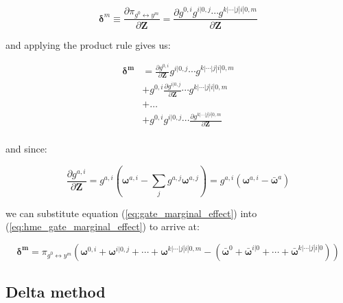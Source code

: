 \documentclass[12pt]{article}
\newcommand{\mean}[1]{\bar{#1}}
\newcommand{\gateprod}[2]{\pi_{#1 \longleftrightarrow #2}}
\begin{document}
\begin{equation}
  \boldsymbol{\delta}^{m} \equiv \frac{\partial \gateprod{g^{0}}{y^{m}}}{\partial \boldsymbol{Z}} = \frac{\partial g^{0, i} g^{i|0, j} \cdots g^{k|\cdots|j|i|0, m}}{\partial \boldsymbol{Z}}
\end{equation}

and applying the product rule gives us:

\begin{equation} \label{eq:hme_gate_marginal_effect}
  \begin{split}
    \boldsymbol{\delta^{m}} &= \frac{\partial g^{0, i}}{\partial \boldsymbol{Z}} g^{i|0, j} \cdots g^{k|\cdots|j|i|0, m}                       \\
                                     &+ g^{0, i} \frac{\partial g^{i|0, j}}{\partial \boldsymbol{Z}} \cdots g^{k|\cdots|j|i|0, m} \\
                                     &+ \dots                                                                                     \\
                                     &+ g^{0, i} g^{i|0, j} \cdots \frac{\partial g^{k|\cdots|j|i|0, m}}{\partial \boldsymbol{Z}} \\
  \end{split}
\end{equation}

and since:

\begin{equation} \label{eq:gate_marginal_effect}
  \frac{\partial g^{a, i}}{\partial \boldsymbol{Z}} = g^{a, i} \left( \boldsymbol{\omega}^{a, i} - \sum_{j} g^{a, j} \boldsymbol{\omega}^{a, j} \right) = g^{a, i} \left( \boldsymbol{\omega}^{a, i} - \mean{\boldsymbol{\omega}}^{a} \right)
\end{equation}

we can substitute equation (\ref{eq:gate_marginal_effect}) into
(\ref{eq:hme_gate_marginal_effect}) to arrive at:

\begin{equation} \label{eq:marginal_effects}
  \boldsymbol{\delta^{m}} = \gateprod{g^{0}}{y^{m}} \left(\boldsymbol{\omega}^{0, i} + \boldsymbol{\omega}^{i|0, j} + \cdots + \boldsymbol{\omega}^{k|\cdots|j|i|0, m} - \left( \mean{\boldsymbol{\omega}}^{0} + \mean{\boldsymbol{\omega}}^{i|0} + \cdots + \mean{\boldsymbol{\omega}}^{k|\cdots|j|i|0} \right) \right)
\end{equation}


\subsection{Delta method}
\end{document}
